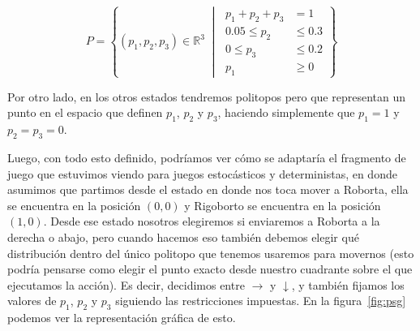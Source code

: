 \[
	P = \left\{ (p_1, p_2, p_3) \in \mathbb{R}^3 \;\middle|\;
	\begin{aligned}
		p_1 + p_2 + p_3 &= 1 \\
		0.05 \leq p_2 &\leq 0.3 \\
		0 \leq p_3 &\leq 0.2 \\
		p_1 &\geq 0
	\end{aligned}
	\right\}
\]

Por otro lado, en los otros estados tendremos politopos pero que representan un
punto en el espacio que definen $p_1$, $p_2$ y $p_3$, haciendo simplemente que
$p_1 = 1$ y $p_2 = p_3 = 0$.

Luego, con todo esto definido, podríamos ver cómo se adaptaría el fragmento de
juego que estuvimos viendo para juegos estocásticos y deterministas, en donde
asumimos que partimos desde el estado en donde nos toca mover a Roborta, ella
se encuentra en la posición $(0,0)$ y Rigoborto se encuentra en la posición
$(1,0)$. Desde ese estado nosotros elegiremos si enviaremos a Roborta a la
derecha o abajo, pero cuando hacemos eso también debemos elegir qué
distribución dentro del único politopo que tenemos usaremos para movernos (esto
podría pensarse como elegir el punto exacto desde nuestro cuadrante sobre el
que ejecutamos la acción). Es decir, decidimos entre $\rightarrow$ y
$\downarrow$, y también fijamos los valores de $p_1$, $p_2$ y $p_3$ siguiendo
las restricciones impuestas. En la figura~\ref{fig:psg} podemos ver la
representación gráfica de esto.

